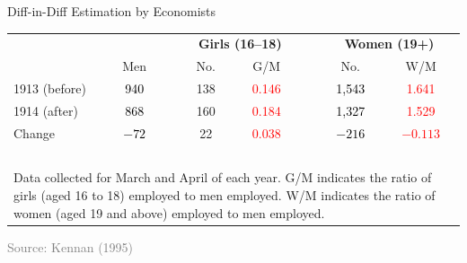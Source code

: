 \documentclass[10pt,xcolor=table,ignorenonframetext,handout,aspectratio=169]{beamer}
\begin{document}

\begin{frame}{Diff-in-Diff Estimation by Economists}

\medskip
\begin{center}
	\begin{center}
		\begin{footnotesize}
			\begingroup
			\setlength{\tabcolsep}{2pt} %
			\renewcommand{\arraystretch}{1.6} %
			\begin{tabular}{lccccccc}
				\hline
				& & & \multicolumn{2}{c}{\textbf{Girls (16--18)}} & & \multicolumn{2}{c}{\textbf{Women (19+)}} \\ \cline{4-5} \cline{7-8}	
				& Men & & No. & G/M & & No. & W/M \\ \hline
				1913 (before)	& \textcolor{black}{940} & & 138 & \textcolor{red}{0.146} & & \textcolor{black}{1,543}	& \textcolor{red}{1.641} \\
				1914 (after) 	& \textcolor{black}{868} & & 160 & \textcolor{red}{0.184} & & \textcolor{black}{1,327} & \textcolor{red}{1.529} \\
				Change						& \textcolor{black}{$-72$}	& & 22  & \textcolor{red}{0.038} & & \textcolor{black}{$-216$} & \textcolor{red}{$-0.113$} \\ \hline 
				& & & \multicolumn{1}{p{1cm}}{$\ $} & \multicolumn{1}{p{1cm}}{$\ $} & & \multicolumn{1}{p{1cm}}{$\ $} & \multicolumn{1}{p{1cm}}{$\ $} \\ [-2.2em]
				\multicolumn{8}{p{7.2cm}}{\tiny{Data collected for March and April of each year.  G/M indicates the ratio of girls (aged 16 to 18) employed to men employed. W/M indicates the ratio of women (aged 19 and above) employed to men employed. }} \\
			\end{tabular}
			\endgroup
		\end{footnotesize}
	\end{center}
	
	\smallskip
	
	\textcolor{gray}{\tiny{Source:  Kennan (1995)}}
\end{center}

\end{frame}
\end{document}
